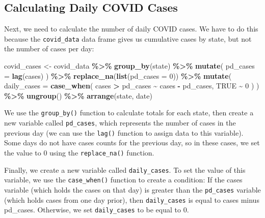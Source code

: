 \documentclass[
]{book}
\newenvironment{Shaded}{\begin{snugshade}}{\end{snugshade}}
\newcommand{\AttributeTok}[1]{\textcolor[rgb]{0.13,0.29,0.53}{#1}}
\newcommand{\ConstantTok}[1]{\textcolor[rgb]{0.56,0.35,0.01}{#1}}
\newcommand{\DecValTok}[1]{\textcolor[rgb]{0.00,0.00,0.81}{#1}}
\newcommand{\FunctionTok}[1]{\textcolor[rgb]{0.13,0.29,0.53}{\textbf{#1}}}
\newcommand{\NormalTok}[1]{#1}
\newcommand{\OtherTok}[1]{\textcolor[rgb]{0.56,0.35,0.01}{#1}}
\newcommand{\SpecialCharTok}[1]{\textcolor[rgb]{0.81,0.36,0.00}{\textbf{#1}}}
\begin{document}
\hypertarget{calculating-daily-covid-cases}{%
\subsection*{Calculating Daily COVID Cases}\label{calculating-daily-covid-cases}}

Next, we need to calculate the number of daily COVID cases. We have to do this because the \texttt{covid\_data} data frame gives us cumulative cases by state, but not the number of cases per day:

\begin{Shaded}
\begin{Highlighting}[]
\NormalTok{covid\_cases }\OtherTok{\textless{}{-}}\NormalTok{ covid\_data }\SpecialCharTok{\%\textgreater{}\%}
  \FunctionTok{group\_by}\NormalTok{(state) }\SpecialCharTok{\%\textgreater{}\%}
  \FunctionTok{mutate}\NormalTok{(}
    \AttributeTok{pd\_cases =} \FunctionTok{lag}\NormalTok{(cases)}
\NormalTok{  ) }\SpecialCharTok{\%\textgreater{}\%}
  \FunctionTok{replace\_na}\NormalTok{(}\FunctionTok{list}\NormalTok{(}\AttributeTok{pd\_cases =} \DecValTok{0}\NormalTok{)) }\SpecialCharTok{\%\textgreater{}\%}
  \FunctionTok{mutate}\NormalTok{(}
    \AttributeTok{daily\_cases =} \FunctionTok{case\_when}\NormalTok{(}
\NormalTok{      cases }\SpecialCharTok{\textgreater{}}\NormalTok{ pd\_cases }\SpecialCharTok{\textasciitilde{}}\NormalTok{ cases }\SpecialCharTok{{-}}\NormalTok{ pd\_cases,}
      \ConstantTok{TRUE} \SpecialCharTok{\textasciitilde{}} \DecValTok{0}
\NormalTok{    )}
\NormalTok{  ) }\SpecialCharTok{\%\textgreater{}\%}
  \FunctionTok{ungroup}\NormalTok{() }\SpecialCharTok{\%\textgreater{}\%}
  \FunctionTok{arrange}\NormalTok{(state, date)}
\end{Highlighting}
\end{Shaded}

We use the \texttt{group\_by()} function to calculate totals for each state, then create a new variable called \texttt{pd\_cases}, which represents the number of cases in the previous day (we can use the \texttt{lag()} function to assign data to this variable). Some days do not have cases counts for the previous day, so in these cases, we set the value to 0 using the \texttt{replace\_na()} function.

Finally, we create a new variable called \texttt{daily\_cases}. To set the value of this variable, we use the \texttt{case\_when()} function to create a condition: If the cases variable (which holds the cases on that day) is greater than the \texttt{pd\_cases} variable (which holds cases from one day prior), then \texttt{daily\_cases} is equal to cases minus pd\_cases. Otherwise, we set \texttt{daily\_cases} to be equal to 0.
\end{document}
